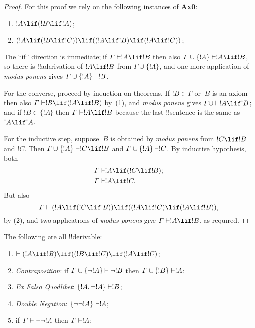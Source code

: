 \documentclass[../../include/open-logic-section]{subfiles}
\begin{document}
\begin{proof} 
For this proof we rely on the following instances of \textbf{Ax0}:
\begin{enumerate} 
\item $!A \lif (!B \lif !A)$; 
\item $(!A \lif (!B \lif !C)) \lif ((!A \lif !B) \lif (!A \lif !C))$; 
\end{enumerate}

The ``if'' direction is immediate; if $\Gamma \Proves !A \lif !B$ then also
$\Gamma \cup \{!A\} \Proves !A \lif !B$, so there is !!a{derivation} of
$!A \lif !B$ from $\Gamma \cup \{!A\}$, and one more application of
\emph{modus ponens} gives $\Gamma \cup \{!A\} \Proves !B$.

For the converse, proceed by induction on theorems. If $!B \in \Gamma$ or
$!B$ is an axiom then also $\Gamma \Proves !B \lif (!A \lif !B)$ by~(1), and
\emph{modus ponens} gives $\Gamma\cup \Proves !A \lif !B$; and if $!B \in
\{ !A\}$ then $\Gamma \Proves !A \lif !B$ because the last !!{sentence} is
the same as $!A \lif !A$.

For the inductive step, suppose $!B$ is obtained by \emph{modus ponens}
from $!C \lif !B$ and $!C$. Then $\Gamma \cup \{ !A\} \Proves !C \lif !B$
and $\Gamma \cup \{ !A\} \Proves !C$. By inductive hypothesis, both
\begin{align*} 
& \Gamma \Proves !A \lif (!C \lif !B); \\ 
& \Gamma \Proves !A \lif !C. 
\end{align*} 
But also 
\[ 
\Gamma \Proves (!A \lif (!C \lif !B))
\lif ((!A\lif !C) \lif (!A \lif !B)), 
\] 
by (2), and two applications of \emph{modus ponens} give $\Gamma
\Proves !A \lif !B$, as required.
\end{proof}

\begin{prop}
The following are all !!{derivable}:
\begin{enumerate} 
\item $\Proves (!A \lif !B) \lif ((!B \lif !C) \lif (!A
\lif !C)$;  
\item \emph{Contraposition}: if $\Gamma
\cup \{ \lnot !A\} \Proves \lnot !B$ then $\Gamma \cup \{ !B\} \Proves !A$;
\item \emph{Ex Falso Quodlibet}: $\{ !A, \lnot!A\}
\Proves !B$;  
\item \emph{Double Negation}: $\{
\lnot\lnot!A\} \Proves !A$; 
\item if $\Gamma \Proves
\lnot\lnot!A$ then $\Gamma \Proves !A$;
\end{enumerate} \end{prop}
\end{document}
